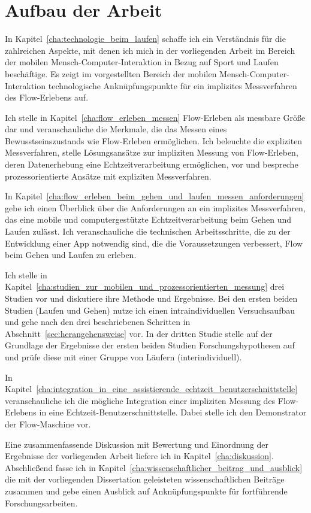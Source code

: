 

\section{Aufbau der Arbeit} 

\label{sec:aufbau_der_arbeit}

In Kapitel~\ref{cha:technologie_beim_laufen} schaffe ich ein Verständnis für die zahlreichen Aspekte, mit denen ich mich in der vorliegenden Arbeit im Bereich der mobilen Mensch-Computer-Interaktion in Bezug auf Sport und Laufen beschäftige. Es zeigt im vorgestellten Bereich der mobilen Mensch-Computer-Interaktion technologische Anknüpfungspunkte für ein implizites Messverfahren des Flow-Erlebens auf.

Ich stelle in Kapitel~\ref{cha:flow_erleben_messen} Flow-Erleben als messbare Größe dar und veranschauliche die Merkmale, die das Messen eines Bewusstseinszustands wie Flow-Erleben ermöglichen. Ich beleuchte die expliziten Messverfahren, stelle Lösungsansätze zur impliziten Messung von Flow-Erleben, deren Datenerhebung eine Echtzeitverarbeitung ermöglichen, vor und bespreche prozessorientierte Ansätze mit expliziten Messverfahren.

In Kapitel~\ref{cha:flow_erleben_beim_gehen_und_laufen_messen_anforderungen} gebe ich einen Überblick über die Anforderungen an ein implizites Messverfahren, das eine mobile und computergestützte Echtzeitverarbeitung beim Gehen und Laufen zulässt. Ich veranschauliche die technischen Arbeitsschritte, die zu der Entwicklung einer App notwendig sind, die die Voraussetzungen verbessert, Flow beim Gehen und Laufen zu erleben.

Ich stelle in Kapitel~\ref{cha:studien_zur_mobilen_und_prozessorientierten_messung} drei Studien vor und diskutiere ihre Methode und Ergebnisse. Bei den ersten beiden Studien (Laufen und Gehen) nutze ich einen intraindividuellen Versuchsaufbau und gehe nach den drei beschriebenen Schritten in Abschnitt~\ref{sec:herangehensweise} vor. In der dritten Studie stelle auf der Grundlage der Ergebnisse der ersten beiden Studien Forschungshypothesen auf und prüfe diese mit einer Gruppe von Läufern (interindividuell).

In Kapitel~\ref{cha:integration_in_eine_assistierende_echtzeit_benutzerschnittstelle} veranschauliche ich die mögliche Integration einer impliziten Messung des Flow-Erlebens in eine Echtzeit-Benutzerschnittstelle. Dabei stelle ich den Demonstrator der Flow-Maschine vor.

Eine zusammenfassende Diskussion mit Bewertung und Einordnung der Ergebnisse der vorliegenden Arbeit liefere ich in Kapitel~\ref{cha:diskussion}. Abschließend fasse ich in Kapitel~\ref{cha:wissenschaftlicher_beitrag_und_ausblick} die mit der vorliegenden Dissertation geleisteten wissenschaftlichen Beiträge zusammen und gebe einen Ausblick auf Anknüpfungspunkte für fortführende Forschungsarbeiten.

